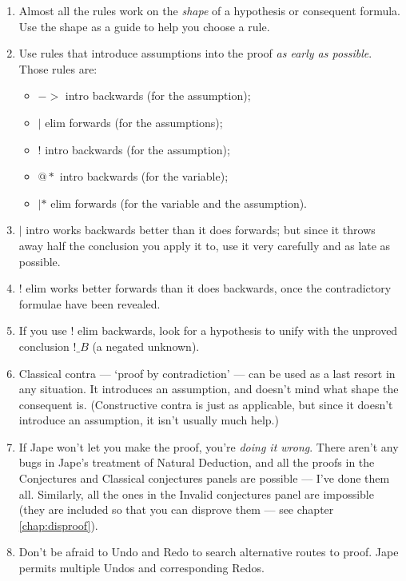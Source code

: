\documentclass[11pt]{book}
\newcommand{\chapref}[1]{chapter \ref{chap:#1}}
\begin{document}
\begin{enumerate}
\item Almost all the rules work on the \emph{shape} of a hypothesis 
or consequent formula. Use the shape as a guide to help you choose 
a rule.

\item Use rules that introduce assumptions into the proof \emph{as 
early as possible}. Those rules are: 
\begin{itemize}
\item $->$ intro backwards (for the assumption);
\item $|$ elim forwards (for the assumptions);
\item $!$ intro backwards (for the assumption);
\item $@*$ intro backwards (for the variable);
\item $|*$ elim forwards (for the variable and the assumption).
\end{itemize}

\item $|$ intro works backwards better than it does forwards; but 
since it throws away half the conclusion you apply it to, use 
it very carefully and as late as possible.

\item $!$ elim works better forwards than it does backwards, 
once the contradictory formulae have been revealed.

\item If you use $!$ elim backwards, look for a hypothesis 
to unify with the unproved conclusion $!\_B$ (a negated 
unknown).

\item Classical contra --- `proof by contradiction' --- can be used as 
a last resort in any situation. It introduces an assumption, 
and doesn't mind what shape the consequent is. (Constructive 
contra is just as applicable, but since it doesn't introduce 
an assumption, it isn't usually much help.)

\item If Jape won't let you make the proof, you're \emph{doing it wrong}. 
There aren't any bugs in Jape's treatment of Natural Deduction, 
and all the proofs in the Conjectures and Classical conjectures 
panels are possible --- I've done them all. Similarly, all the 
ones in the Invalid conjectures panel are impossible (they are 
included so that you can disprove them --- see \chapref{disproof}).

\item Don't be afraid to Undo and Redo to search alternative routes to proof. Jape permits multiple Undos and corresponding Redos.

\end{enumerate}
\end{document}
